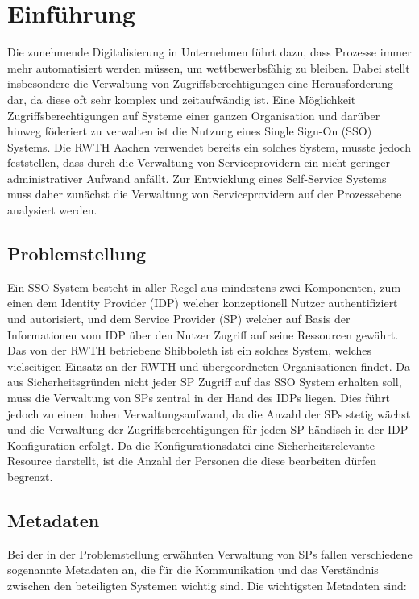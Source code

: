 \documentclass[a4paper, fontsize=11pt]{scrartcl}
\begin{document}


\tableofcontents
\newpage


\section{Einführung}\label{sec:einfuehrung}
Die zunehmende Digitalisierung in Unternehmen führt dazu, dass Prozesse immer mehr automatisiert werden müssen, um wettbewerbsfähig zu bleiben.
Dabei stellt insbesondere die Verwaltung von Zugriffsberechtigungen eine Herausforderung dar, da diese oft sehr komplex und zeitaufwändig ist.
Eine Möglichkeit Zugriffsberechtigungen auf Systeme einer ganzen Organisation und darüber hinweg föderiert zu verwalten ist die Nutzung eines Single Sign-On (SSO) Systems.
Die RWTH Aachen verwendet bereits ein solches System, musste jedoch feststellen, dass durch die Verwaltung von Serviceprovidern ein nicht geringer administrativer Aufwand anfällt.
Zur Entwicklung eines Self-Service Systems muss daher zunächst die Verwaltung von Serviceprovidern auf der Prozessebene analysiert werden.

\subsection{Problemstellung}\label{subsec:problemstellung}
Ein SSO System besteht in aller Regel aus mindestens zwei Komponenten, zum einen dem Identity Provider (IDP) welcher konzeptionell Nutzer authentifiziert und autorisiert, und dem Service Provider (SP) welcher auf Basis der Informationen vom IDP über den Nutzer Zugriff auf seine Ressourcen gewährt.
Das von der RWTH betriebene Shibboleth ist ein solches System, welches vielseitigen Einsatz an der RWTH und übergeordneten Organisationen findet.
Da aus Sicherheitsgründen nicht jeder SP Zugriff auf das SSO System erhalten soll, muss die Verwaltung von SPs zentral in der Hand des IDPs liegen. 
Dies führt jedoch zu einem hohen Verwaltungsaufwand, da die Anzahl der SPs stetig wächst und die Verwaltung der Zugriffsberechtigungen für jeden SP händisch in der IDP Konfiguration erfolgt.
Da die Konfigurationsdatei eine Sicherheitsrelevante Resource darstellt, ist die Anzahl der Personen die diese bearbeiten dürfen begrenzt.

\subsection{Metadaten}
Bei der in der Problemstellung erwähnten Verwaltung von SPs fallen verschiedene sogenannte Metadaten an, die für die Kommunikation und das Verständnis zwischen den beteiligten Systemen wichtig sind. Die wichtigsten Metadaten sind:
\end{document}
